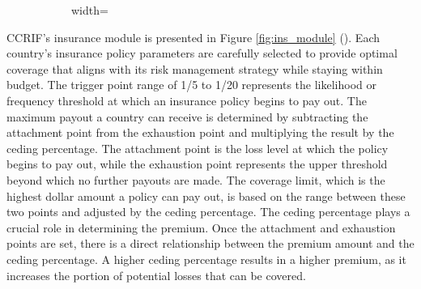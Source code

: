 \documentclass[fleqn,mnsc,nonblindrev]{informs4}
\begin{document}
\begin{figure}[t]
\begin{subfigure}[b]{0.35\textwidth}
\begin{adjustbox}{width=\textwidth}
\end{adjustbox}
\subcaption{}
\label{fig:rein_module}
\end{subfigure}
\label{fig:ccrif_module_program}
\end{figure}

CCRIF's insurance module is presented in 
Figure \ref{fig:ins_module} (\cite{CCRF_TC2023_2023}). Each country’s insurance policy parameters are carefully selected to provide optimal coverage that aligns with its risk management strategy while staying within budget. The trigger point range of 1/5 to 1/20 represents the likelihood or frequency threshold at which an insurance policy begins to pay out. The maximum payout a country can receive is determined by subtracting the attachment point from the exhaustion point and multiplying the result by the ceding percentage. The attachment point is the loss level at which the policy begins to pay out, while the exhaustion point represents the upper threshold beyond which no further payouts are made. The coverage limit, which is the highest dollar amount a policy can pay out, is based on the range between these two points and adjusted by the ceding percentage. The ceding percentage plays a crucial role in determining the premium. Once the attachment and exhaustion points are set, there is a direct relationship between the premium amount and the ceding percentage. A higher ceding percentage results in a higher premium, as it increases the portion of potential losses that can be covered. 
\end{document}
